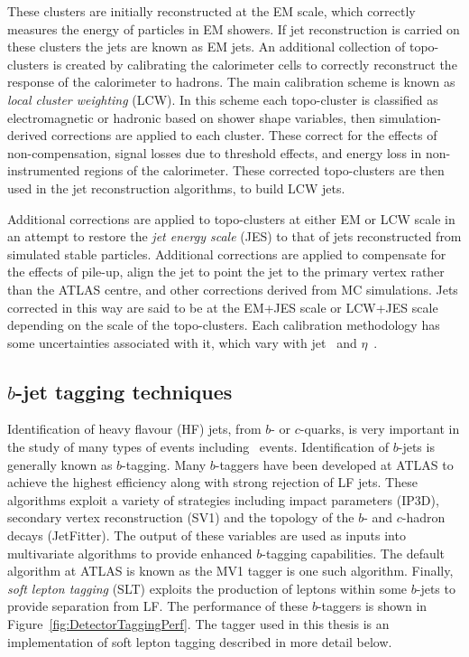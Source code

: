 These clusters are initially reconstructed at the EM scale, which correctly measures the energy of particles in EM showers. If jet reconstruction is carried on these clusters the jets are known as EM jets. An additional collection of topo-clusters is created by calibrating the calorimeter cells to correctly reconstruct the response of the calorimeter to hadrons. The main calibration scheme is known as \emph{local cluster weighting} (LCW). In this scheme each topo-cluster is classified as electromagnetic or hadronic based on shower shape variables, then simulation-derived corrections are applied to each cluster. These correct for the effects of non-compensation, signal losses due to threshold effects, and energy loss in non-instrumented regions of the calorimeter. These corrected topo-clusters are then used in the jet reconstruction algorithms, to build LCW jets. 

Additional corrections are applied to topo-clusters at either EM or LCW scale in an attempt to restore the \emph{jet energy scale} (JES) to that of jets reconstructed from simulated stable particles. Additional corrections are applied to compensate for the effects of pile-up, align the jet to point the jet to the primary vertex rather than the ATLAS centre, and other corrections derived from MC simulations. Jets corrected in this way are said to be at the EM+JES scale or LCW+JES scale depending on the scale of the topo-clusters. Each calibration methodology has some uncertainties associated with it, which vary with jet \pt\ and $\eta$~\cite{Detector:JESPaper}.

\subsection{\texorpdfstring{$b$}{b}-jet tagging techniques}

Identification of heavy flavour (HF) jets, from $b$- or $c$-quarks, is very important in the study of many types of events including \ttbar\ events. Identification of $b$-jets is generally known as $b$-tagging. Many $b$-taggers have been developed at ATLAS to achieve the highest efficiency along with strong rejection of LF jets. These algorithms exploit a variety of strategies including impact parameters (IP3D), secondary vertex reconstruction (SV1) and the topology of the $b$- and $c$-hadron decays (JetFitter). The output of these variables are used as inputs into multivariate algorithms to provide enhanced $b$-tagging capabilities. The default algorithm at ATLAS is known as the MV1 tagger is one such algorithm. Finally, \emph{soft lepton tagging} (SLT) exploits the production of leptons within some $b$-jets to provide separation from LF. The performance of these $b$-taggers is shown in Figure~\ref{fig:DetectorTaggingPerf}. The tagger used in this thesis is an implementation of soft lepton tagging described in more detail below.

